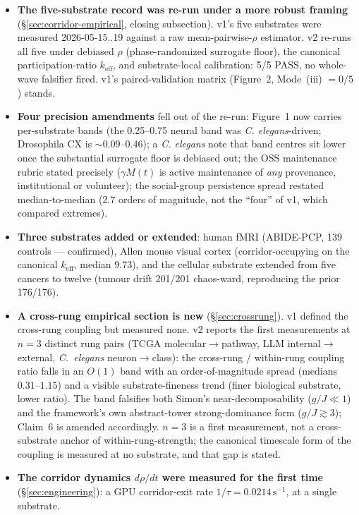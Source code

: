 \documentclass[11pt,a4paper]{article}
\newcommand{\keff}{k_{\text{eff}}}
\begin{document}
\begin{itemize}[leftmargin=*,itemsep=0.5em]
\item \textbf{The five-substrate record was re-run under a more robust framing} (\S\ref{sec:corridor-empirical}, closing subsection). v1's five substrates were measured 2026-05-15..19 against a raw mean-pairwise-$\rho$ estimator. v2 re-runs all five under debiased $\rho$ (phase-randomized surrogate floor), the canonical participation-ratio $\keff$, and substrate-local calibration: 5/5 PASS, no whole-wave falsifier fired. v1's paired-validation matrix (Figure~2, Mode~(iii) $= 0/5$) stands.
\item \textbf{Four precision amendments} fell out of the re-run: Figure~1 now carries per-substrate bands (the 0.25--0.75 neural band was \emph{C. elegans}-driven; Drosophila CX is $\sim 0.09$--$0.46$); a \emph{C. elegans} note that band centres sit lower once the substantial surrogate floor is debiased out; the OSS maintenance rubric stated precisely ($\gamma M(t)$ is active maintenance of \emph{any} provenance, institutional or volunteer); the social-group persistence spread restated median-to-median (2.7 orders of magnitude, not the ``four'' of v1, which compared extremes).
\item \textbf{Three substrates added or extended}: human fMRI (ABIDE-PCP, 139 controls --- confirmed), Allen mouse visual cortex (corridor-occupying on the canonical $\keff$, median $9.73$), and the cellular substrate extended from five cancers to twelve (tumour drift 201/201 chaos-ward, reproducing the prior 176/176).
\item \textbf{A cross-rung empirical section is new} (\S\ref{sec:crossrung}). v1 defined the cross-rung coupling but measured none. v2 reports the first measurements at $n = 3$ distinct rung pairs (TCGA molecular$\to$pathway, LLM internal$\to$external, \emph{C.~elegans} neuron$\to$class): the cross-rung / within-rung coupling ratio falls in an $O(1)$ band with an order-of-magnitude spread (medians $0.31$--$1.15$) and a visible substrate-fineness trend (finer biological substrate, lower ratio). The band falsifies both Simon's near-decomposability ($g/J \ll 1$) and the framework's own abstract-tower strong-dominance form ($g/J \gtrsim 3$); Claim~6 is amended accordingly. $n = 3$ is a first measurement, not a cross-substrate anchor of within-rung-strength; the canonical timescale form of the coupling is measured at no substrate, and that gap is stated.
\item \textbf{The corridor dynamics $d\rho/dt$ were measured for the first time} (\S\ref{sec:engineering}): a GPU corridor-exit rate $1/\tau = 0.0214\,\mathrm{s}^{-1}$, at a single substrate.

\end{itemize}
\end{document}
